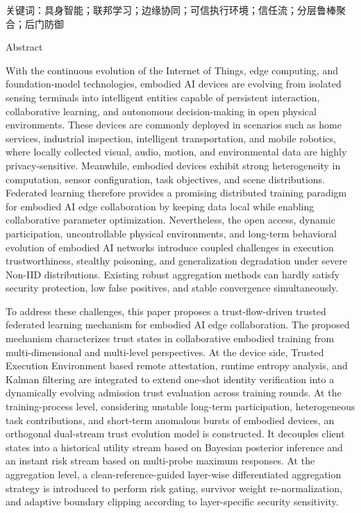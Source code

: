 \documentclass[11pt, a4paper, UTF8, fontset=fandol]{ctexart}
\begin{document}
关键词：具身智能；联邦学习；边缘协同；可信执行环境；信任流；分层鲁棒聚合；后门防御

\begin{center}
    Abstract
\end{center}
With the continuous evolution of the Internet of Things, edge computing, and foundation-model technologies, embodied AI devices are evolving from isolated sensing terminals into intelligent entities capable of persistent interaction, collaborative learning, and autonomous decision-making in open physical environments. These devices are commonly deployed in scenarios such as home services, industrial inspection, intelligent transportation, and mobile robotics, where locally collected visual, audio, motion, and environmental data are highly privacy-sensitive. Meanwhile, embodied devices exhibit strong heterogeneity in computation, sensor configuration, task objectives, and scene distributions. Federated learning therefore provides a promising distributed training paradigm for embodied AI edge collaboration by keeping data local while enabling collaborative parameter optimization. Nevertheless, the open access, dynamic participation, uncontrollable physical environments, and long-term behavioral evolution of embodied AI networks introduce coupled challenges in execution trustworthiness, stealthy poisoning, and generalization degradation under severe Non-IID distributions. Existing robust aggregation methods can hardly satisfy security protection, low false positives, and stable convergence simultaneously.

To address these challenges, this paper proposes a trust-flow-driven trusted federated learning mechanism for embodied AI edge collaboration. The proposed mechanism characterizes trust states in collaborative embodied training from multi-dimensional and multi-level perspectives. At the device side, Trusted Execution Environment based remote attestation, runtime entropy analysis, and Kalman filtering are integrated to extend one-shot identity verification into a dynamically evolving admission trust evaluation across training rounds. At the training-process level, considering unstable long-term participation, heterogeneous task contributions, and short-term anomalous bursts of embodied devices, an orthogonal dual-stream trust evolution model is constructed. It decouples client states into a historical utility stream based on Bayesian posterior inference and an instant risk stream based on multi-probe maximum responses. At the aggregation level, a clean-reference-guided layer-wise differentiated aggregation strategy is introduced to perform risk gating, survivor weight re-normalization, and adaptive boundary clipping according to layer-specific security sensitivity.
\end{document}
